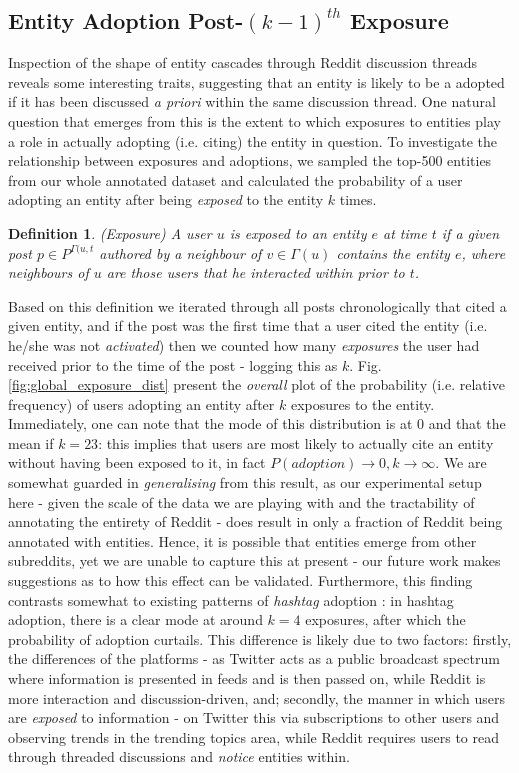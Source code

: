 \documentclass[journal,10pt,draftclsnofoot,onecolumn]{IEEEtran}
\newtheorem{mydef}{Definition}
\begin{document}
\subsection{Entity Adoption Post-$({k-1})^{th}$ Exposure}
Inspection of the shape of entity cascades through Reddit discussion threads reveals some interesting traits, suggesting that an entity is likely to be a adopted if it has been discussed \emph{a priori} within the same discussion thread.
One natural question that emerges from this is the extent to which exposures to entities play a role in actually adopting (i.e. citing) the entity in question.
To investigate the relationship between exposures and adoptions, we sampled the top-500 entities from our whole annotated dataset and calculated the probability of a user adopting an entity after being \emph{exposed} to the entity $k$ times.

\begin{mydef}
\label{def:exposure}
(Exposure) A user $u$ is exposed to an entity $e$ at time $t$ if a given post $p \in P^{\Gamma(u,t}$ authored by a neighbour of $v \in \Gamma(u)$ contains the entity $e$, where neighbours of $u$ are those users that he interacted within prior to $t$.
\end{mydef}

Based on this definition we iterated through all posts chronologically that cited a given entity, and if the post was the first time that a user cited the entity (i.e. he/she was not \emph{activated}) then we counted how many \emph{exposures} the user had received prior to the time of the post - logging this as $k$.
Fig. \ref{fig:global_exposure_dist} present the \emph{overall} plot of the probability (i.e. relative frequency) of users adopting an entity after $k$ exposures to the entity.
Immediately, one can note that the mode of this distribution is at $0$ and that the mean if $k=23$: this implies that users are most likely to actually cite an entity without having been exposed to it, in fact $P(adoption) \rightarrow 0, k \rightarrow \infty$.
We are somewhat guarded in \emph{generalising} from this result, as our experimental setup here - given the scale of the data we are playing with and the tractability of annotating the entirety of Reddit - does result in only a fraction of Reddit being annotated with entities.
Hence, it is possible that entities emerge from other subreddits, yet we are unable to capture this at present - our future work makes suggestions as to how this effect can be validated.
Furthermore, this finding contrasts somewhat to existing patterns of \emph{hashtag} adoption \cite{romero2011differences}: in hashtag adoption, there is a clear mode at around $k=4$ exposures, after which the probability of adoption curtails.
This difference is likely due to two factors: firstly, the differences of the platforms - as Twitter acts as a public broadcast spectrum where information is presented in feeds and is then passed on, while Reddit is more interaction and discussion-driven, and; secondly, the manner in which users are \emph{exposed} to information - on Twitter this via subscriptions to other users and observing trends in the trending topics area, while Reddit requires users to read through threaded discussions and \emph{notice} entities within.
\end{document}
